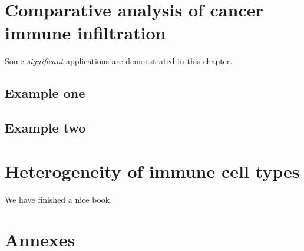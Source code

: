 \documentclass[12pt,]{book}
\theoremstyle{definition}
\theoremstyle{definition}
\theoremstyle{definition}
\theoremstyle{remark}
\begin{document}
\hypertarget{results}{%
\chapter{Comparative analysis of cancer immune
infiltration}\label{results}}

Some \emph{significant} applications are demonstrated in this chapter.

\hypertarget{example-one}{%
\section{Example one}\label{example-one}}

\hypertarget{example-two}{%
\section{Example two}\label{example-two}}

\hypertarget{map}{%
\chapter{Heterogeneity of immune cell types}\label{map}}

We have finished a nice book.

\hypertarget{annexes}{%
\chapter*{Annexes}\label{annexes}}


\end{document}
